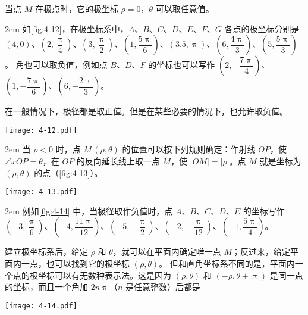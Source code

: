 \medskip
当点 $M$ 在极点时，它的极坐标 $\rho=0$，$\theta$ 可以取任意值。


\medskip\noindent
\begin{minipage}{0.45\linewidth}\parindent2em
如\cref{fig:4-12}，在极坐标系中，$A$、$B$、$C$、$D$、$E$、$F$、$G$ 各点的极坐标分别是 $(4,0)$、$\left(2,\dfrac{\uppi}{4}\right)$、$\left(3,\dfrac{\uppi}{2}\right)$、$\left(1,\dfrac{5\uppi}{6}\right)$、$(3.5,\uppi)$、$\left(6,\dfrac{4\uppi}{3}\right)$、$\left(5,\dfrac{5\uppi}{3}\right)$。
角也可以取负值，例如点 $B$、$D$、$F$ 的坐标也可以写作 $\left(2,-\dfrac{7\uppi}{4}\right)$、$\left(1,-\dfrac{7\uppi}{6}\right)$、$\left(6,-\dfrac{2\uppi}{3}\right)$。

\smallskip
在一般情况下，极径都是取正值。但是在某些必要的情况下，也允许取负值。
\end{minipage}\hfill
\begin{minipage}{0.5\linewidth}\centering
  \begin{figurehere}
    \texttt{[image: 4-12.pdf]}
    \caption{}\label{fig:4-12}
  \end{figurehere}
\end{minipage}

\smallskip\noindent
\begin{minipage}{0.45\linewidth}\parindent2em
当 $\rho<0$ 时，点 $M\,(\rho,\theta)$ 的位置可以按下列规则确定：作射线 $OP$，使 $\angle xOP=\theta$，在 $OP$ 的反向延长线上取一点 $M$，使 $|OM|=|\rho|$。点 $M$ 就是坐标为 $(\rho,\theta)$ 的点（\cref{fig:4-13}）。
\end{minipage}\hfill
\begin{minipage}{0.5\linewidth}\centering
\begin{figurehere}
  \texttt{[image: 4-13.pdf]}
  \caption{}\label{fig:4-13}
\end{figurehere}
\end{minipage}

\smallskip\noindent
\begin{minipage}{0.45\linewidth}\parindent2em
例如\cref{fig:4-14} 中，当极径取作负值时，点 $A$、$B$、$C$、$D$、$E$ 的坐标写作 $\left(-3,\dfrac{\uppi}{6}\right)$、$\left(-4,\dfrac{11\uppi}{12}\right)$、$\left(-5,-\dfrac{\uppi}{2}\right)$、$\left(-2,-\dfrac{\uppi}{12}\right)$、$\left(-1,\dfrac{5\uppi}{4}\right)$。

\smallskip
建立极坐标系后，给定 $\rho$ 和 $\theta$，就可以在平面内确定唯一点 $M$；反过来，给定平面内一点，也可以找到它的极坐标 $(\rho,\theta)$。
但和直角坐标系不同的是，平面内一个点的极坐标可以有无数种表示法。这是因为 $(\rho,\theta)$ 和 $(-\rho,\theta+\uppi)$ 是同一点的坐标，而且一个角加 $2n\uppi$（$n$ 是任意整数）后都是
\end{minipage}\hfill
\begin{minipage}{0.5\linewidth}
\begin{figurehere}
  \texttt{[image: 4-14.pdf]}
  \caption{}\label{fig:4-14}
\end{figurehere}
\end{minipage}

